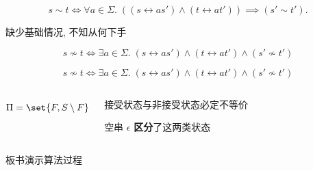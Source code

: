 \begin{frame}{}
  \begin{center}
    \[
      s \sim t \iff \forall a \in \Sigma.\;
        \left((s \rel{a} s') \land (t \rel{a} t')\right) \implies (s' \sim t').
    \]

    缺少基础情况, 不知从何下手

    \pause
    \[
      s \nsim t \iff \exists a \in \Sigma.\;
        (s \rel{a} s') \land (t \rel{a} t') \land (s' \nsim t')
    \]

    \pause
  \end{center}

\end{frame}

\begin{frame}{}
  \begin{center}
    \[
      s \nsim t \iff \exists a \in \Sigma.\;
        (s \rel{a} s') \land (t \rel{a} t') \land (s' \nsim t')
    \]

    \pause
    \vspace{0.30cm}
  \end{center}

  \pause
  \begin{columns}
      \[
        \Pi = \set{F, S \setminus F}
      \]

      \vspace{0.30cm}
      \begin{center}
        接受状态与非接受状态必定不等价

        \pause
        \vspace{0.50cm}
        空串 $\epsilon$ {\bf 区分}了这两类状态
      \end{center}
  \end{columns}
\end{frame}

\begin{frame}{}
  \begin{center}

    \vspace{0.30cm}
    板书演示算法过程
  \end{center}
\end{frame}

